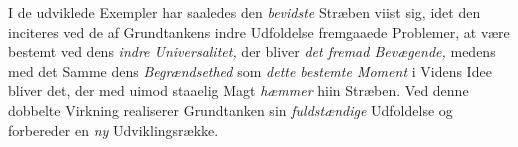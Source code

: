 \divrule

I de udviklede Exempler har saaledes den \emph{bevidste}
Stræben viist sig, idet den inciteres ved de af Grundtankens
indre Udfoldelse fremgaaede Problemer, at være bestemt ved dens
\emph{indre Universalitet,} der bliver \emph{det fremad Bevægende,}
medens med det Samme dens \emph{Begrændsethed} som \emph{dette
bestemte Moment} i Videns Idee bliver det, der med uimod\-%
staaelig Magt \emph{hæmmer} hiin Stræben. Ved denne dobbelte
Virkning realiserer Grundtanken sin \emph{fuldstændige} Udfoldelse
og forbereder en \emph{ny} Udviklingsrække.
%
%
%
